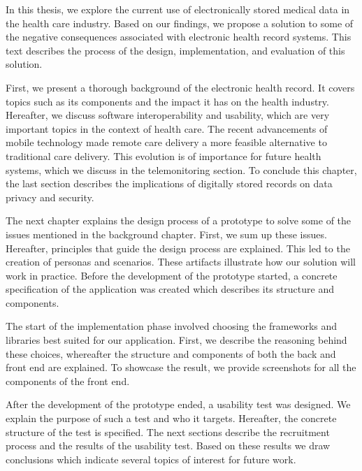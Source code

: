 In this thesis, we explore the current use of electronically stored medical data in the health care industry. Based on our findings, we propose a solution to some of the negative consequences associated with electronic health record systems. This text describes the process of the design, implementation, and evaluation of this solution.

First, we present a thorough background of the electronic health record. It covers topics such as its components and the impact it has on the health industry. Hereafter, we discuss software interoperability and usability, which are very important topics in the context of health care. The recent advancements of mobile technology made remote care delivery a more feasible alternative to traditional care delivery. This evolution is of importance for future health systems, which we discuss in the telemonitoring section. To conclude this chapter, the last section describes the implications of digitally stored records on data privacy and security.

The next chapter explains the design process of a prototype to solve some of the issues mentioned in the background chapter. First, we sum up these issues. Hereafter, principles that guide the design process are explained. This led to the creation of personas and scenarios. These artifacts illustrate how our solution will work in practice. Before the development of the prototype started, a concrete specification of the application was created which describes its structure and components.

The start of the implementation phase involved choosing the frameworks and libraries best suited for our application. First, we describe the reasoning behind these choices, whereafter the structure and components of both the back and front end are explained. To showcase the result, we provide screenshots for all the components of the front end.

After the development of the prototype ended, a usability test was designed. We explain the purpose of such a test and who it targets. Hereafter, the concrete structure of the test is specified. The next sections describe the recruitment process and the results of the usability test. Based on these results we draw conclusions which indicate several topics of interest for future work.
